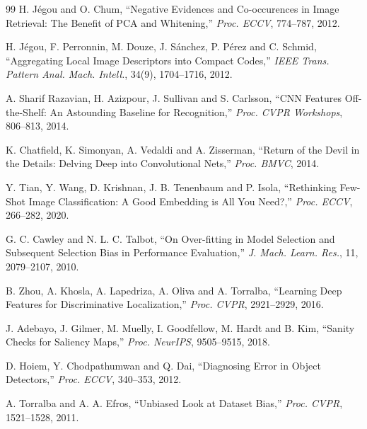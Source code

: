 \begin{thebibliography}{99}
 H. J\'egou and O. Chum, ``Negative Evidences and Co-occurences in Image Retrieval: The Benefit of PCA and Whitening,'' \textit{Proc. ECCV}, 774--787, 2012.

 H. J\'egou, F. Perronnin, M. Douze, J. S\'anchez, P. P\'erez and C. Schmid, ``Aggregating Local Image Descriptors into Compact Codes,'' \textit{IEEE Trans. Pattern Anal. Mach. Intell.}, 34(9), 1704--1716, 2012.

 A. Sharif Razavian, H. Azizpour, J. Sullivan and S. Carlsson, ``CNN Features Off-the-Shelf: An Astounding Baseline for Recognition,'' \textit{Proc. CVPR Workshops}, 806--813, 2014.

 K. Chatfield, K. Simonyan, A. Vedaldi and A. Zisserman, ``Return of the Devil in the Details: Delving Deep into Convolutional Nets,'' \textit{Proc. BMVC}, 2014.

 Y. Tian, Y. Wang, D. Krishnan, J. B. Tenenbaum and P. Isola, ``Rethinking Few-Shot Image Classification: A Good Embedding is All You Need?,'' \textit{Proc. ECCV}, 266--282, 2020.

 G. C. Cawley and N. L. C. Talbot, ``On Over-fitting in Model Selection and Subsequent Selection Bias in Performance Evaluation,'' \textit{J. Mach. Learn. Res.}, 11, 2079--2107, 2010.

 B. Zhou, A. Khosla, A. Lapedriza, A. Oliva and A. Torralba, ``Learning Deep Features for Discriminative Localization,'' \textit{Proc. CVPR}, 2921--2929, 2016.

 J. Adebayo, J. Gilmer, M. Muelly, I. Goodfellow, M. Hardt and B. Kim, ``Sanity Checks for Saliency Maps,'' \textit{Proc. NeurIPS}, 9505--9515, 2018.

 D. Hoiem, Y. Chodpathumwan and Q. Dai, ``Diagnosing Error in Object Detectors,'' \textit{Proc. ECCV}, 340--353, 2012.

 A. Torralba and A. A. Efros, ``Unbiased Look at Dataset Bias,'' \textit{Proc. CVPR}, 1521--1528, 2011.

\end{thebibliography}